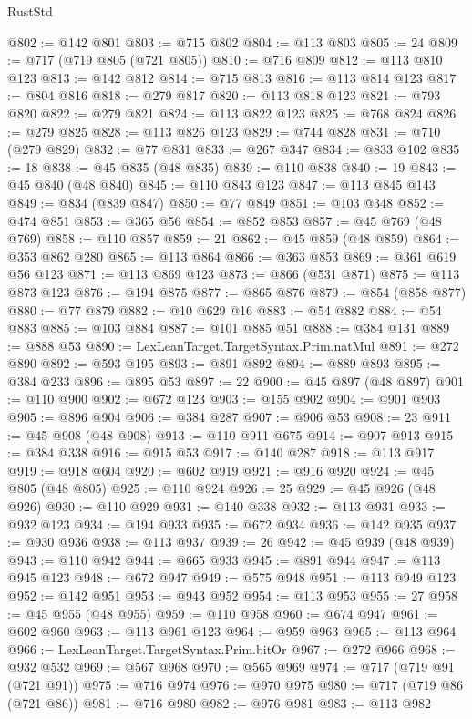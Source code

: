 \begin{lexlean}{RustStd}
\begin{coremodule}
@802 := @142 @801
@803 := @715 @802
@804 := @113 @803
@805 := 24
@809 := @717 (@719 @805 (@721 @805))
@810 := @716 @809
@812 := @113 @810 @123
@813 := @142 @812
@814 := @715 @813
@816 := @113 @814 @123
@817 := @804 @816
@818 := @279 @817
@820 := @113 @818 @123
@821 := @793 @820
@822 := @279 @821
@824 := @113 @822 @123
@825 := @768 @824
@826 := @279 @825
@828 := @113 @826 @123
@829 := @744 @828
@831 := @710 (@279 @829)
@832 := @77 @831
@833 := @267 @347
@834 := @833 @102
@835 := 18
@838 := @45 @835 (@48 @835)
@839 := @110 @838
@840 := 19
@843 := @45 @840 (@48 @840)
@845 := @110 @843 @123
@847 := @113 @845 @143
@849 := @834 (@839 @847)
@850 := @77 @849
@851 := @103 @348
@852 := @474 @851
@853 := @365 @56
@854 := @852 @853
@857 := @45 @769 (@48 @769)
@858 := @110 @857
@859 := 21
@862 := @45 @859 (@48 @859)
@864 := @353 @862 @280
@865 := @113 @864
@866 := @363 @853
@869 := @361 @619 @56 @123
@871 := @113 @869 @123
@873 := @866 (@531 @871)
@875 := @113 @873 @123
@876 := @194 @875
@877 := @865 @876
@879 := @854 (@858 @877)
@880 := @77 @879
@882 := @10 @629 @16
@883 := @54 @882
@884 := @54 @883
@885 := @103 @884
@887 := @101 @885 @51
@888 := @384 @131
@889 := @888 @53
@890 := LexLeanTarget.TargetSyntax.Prim.natMul
@891 := @272 @890
@892 := @593 @195
@893 := @891 @892
@894 := @889 @893
@895 := @384 @233
@896 := @895 @53
@897 := 22
@900 := @45 @897 (@48 @897)
@901 := @110 @900
@902 := @672 @123
@903 := @155 @902
@904 := @901 @903
@905 := @896 @904
@906 := @384 @287
@907 := @906 @53
@908 := 23
@911 := @45 @908 (@48 @908)
@913 := @110 @911 @675
@914 := @907 @913
@915 := @384 @338
@916 := @915 @53
@917 := @140 @287
@918 := @113 @917
@919 := @918 @604
@920 := @602 @919
@921 := @916 @920
@924 := @45 @805 (@48 @805)
@925 := @110 @924
@926 := 25
@929 := @45 @926 (@48 @926)
@930 := @110 @929
@931 := @140 @338
@932 := @113 @931
@933 := @932 @123
@934 := @194 @933
@935 := @672 @934
@936 := @142 @935
@937 := @930 @936
@938 := @113 @937
@939 := 26
@942 := @45 @939 (@48 @939)
@943 := @110 @942
@944 := @665 @933
@945 := @891 @944
@947 := @113 @945 @123
@948 := @672 @947
@949 := @575 @948
@951 := @113 @949 @123
@952 := @142 @951
@953 := @943 @952
@954 := @113 @953
@955 := 27
@958 := @45 @955 (@48 @955)
@959 := @110 @958
@960 := @674 @947
@961 := @602 @960
@963 := @113 @961 @123
@964 := @959 @963
@965 := @113 @964
@966 := LexLeanTarget.TargetSyntax.Prim.bitOr
@967 := @272 @966
@968 := @932 @532
@969 := @567 @968
@970 := @565 @969
@974 := @717 (@719 @91 (@721 @91))
@975 := @716 @974
@976 := @970 @975
@980 := @717 (@719 @86 (@721 @86))
@981 := @716 @980
@982 := @976 @981
@983 := @113 @982

\end{coremodule}
\end{lexlean}
